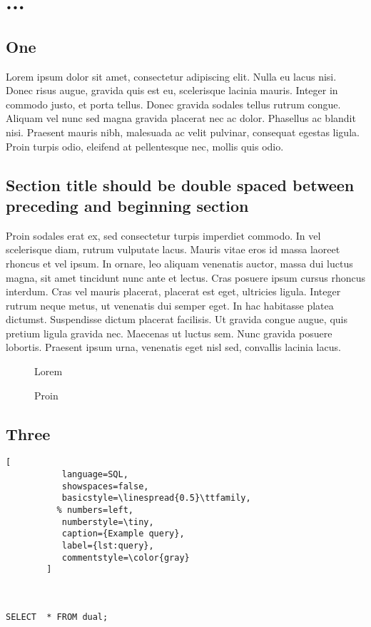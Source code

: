 \chapter{...}	%

\section{One}
Lorem ipsum dolor sit amet, consectetur adipiscing elit. Nulla eu lacus nisi. Donec risus augue, gravida quis est eu, scelerisque lacinia mauris. Integer in commodo justo, et porta tellus. Donec gravida sodales tellus rutrum congue. Aliquam vel nunc sed magna gravida placerat nec ac dolor. Phasellus ac blandit nisi. Praesent mauris nibh, malesuada ac velit pulvinar, consequat egestas ligula. Proin turpis odio, eleifend at pellentesque nec, mollis quis odio.

\section{Section title should be double spaced between preceding and beginning section}
Proin sodales erat ex, sed consectetur turpis imperdiet commodo. In vel scelerisque diam, rutrum vulputate lacus. Mauris vitae eros id massa laoreet rhoncus et vel ipsum. In ornare, leo aliquam venenatis auctor, massa dui luctus magna, sit amet tincidunt nunc ante et lectus. Cras posuere ipsum cursus rhoncus interdum. Cras vel mauris placerat, placerat est eget, ultricies ligula. Integer rutrum neque metus, ut venenatis dui semper eget. In hac habitasse platea dictumst. Suspendisse dictum placerat facilisis. Ut gravida congue augue, quis pretium ligula gravida nec. Maecenas ut luctus sem. Nunc gravida posuere lobortis. Praesent ipsum urna, venenatis eget nisl sed, convallis lacinia lacus.


\begin{figure}
	\centering
	 \caption{Lorem}
\end{figure}

\begin{figure}
	\centering
	 \caption{Proin}
\end{figure}

\pagebreak
\section{Three}

\begin{lstlisting}[
           language=SQL,
           showspaces=false,
           basicstyle=\linespread{0.5}\ttfamily,
          % numbers=left,
           numberstyle=\tiny,
           caption={Example query},
           label={lst:query},
           commentstyle=\color{gray}
        ] 



SELECT  * FROM dual;

\end{lstlisting}

\endinput